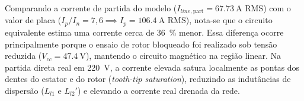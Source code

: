 Comparando a corrente de partida do modelo ($I_{line,\text{part}} = \SI{67,73}{\ampere}$ RMS) com o valor de placa ($I_p / I_n = 7{,}6 \implies I_p = \SI{106,4}{\ampere}$ RMS), nota-se que o circuito equivalente estima uma corrente cerca de \SI{36}{\percent} menor. Essa diferença ocorre principalmente porque o ensaio de rotor bloqueado foi realizado sob tensão reduzida ($V_{cc} = \SI{47,4}{\volt}$), mantendo o circuito magnético na região linear. Na partida direta real em \SI{220}{\volt}, a corrente elevada satura localmente as pontas dos dentes do estator e do rotor (\textit{tooth-tip saturation}), reduzindo as indutâncias de dispersão ($L_{l1}$ e $L_{l2}'$) e elevando a corrente real drenada da rede.